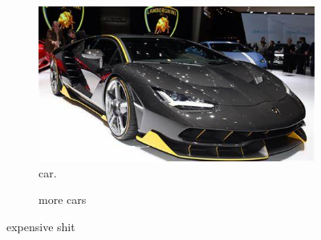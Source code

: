 \documentclass{article}
\begin{document}
	\begin{figure}[h!]
		\centering
		\begin{subfigure}[b]{0.4\linewidth}
			
		\includegraphics[width=\lenght]{car.jpg}
		\caption{car.}
	 \end{subfigure}
     \begin{subfigure}[width=\linewidth]{car.jpg}
     	\caption{more cars}
    \end{subfigure}
    \caption{expensive shit}
    \label{fig:car}
	\end{figure}
\end{document}
